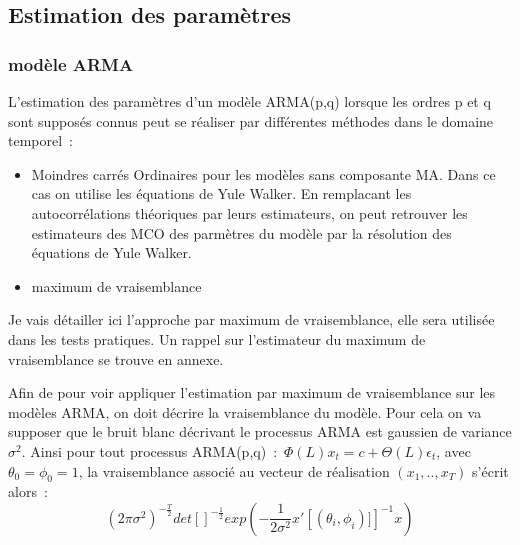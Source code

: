 \documentclass[11pt]{scrartcl} %
\begin{document}
\subsection{Estimation des paramètres}
\subsubsection{modèle ARMA}
L'estimation des paramètres d'un modèle ARMA(p,q) lorsque les ordres p et q sont supposés connus peut se réaliser par différentes méthodes dans le domaine temporel~:
\begin{itemize}
\item Moindres carrés Ordinaires pour les modèles sans composante MA. Dans ce cas on utilise les équations de Yule Walker. En remplacant les autocorrélations théoriques par leurs estimateurs, on peut retrouver les estimateurs des MCO des parmètres du modèle par la résolution des équations de Yule Walker.\\
\item maximum de vraisemblance
\end{itemize}
Je vais détailler ici l'approche par maximum de vraisemblance, elle sera utilisée dans les tests pratiques. Un rappel sur l'estimateur du maximum de vraisemblance se trouve en annexe.

Afin de pour voir appliquer l'estimation par maximum de vraisemblance sur les modèles ARMA, on doit décrire la vraisemblance du modèle. Pour cela on va supposer que le bruit blanc décrivant le processus ARMA est gaussien de variance $\sigma^2$. Ainsi pour tout processus ARMA(p,q)~:~$\Phi(L)x_t = c+ \Theta(L)\epsilon_t$, avec $\theta_0=\phi_0=1$,  la vraisemblance associé au vecteur de réalisation $(x_1,..,x_T)$ s'écrit alors~:
\begin{equation}\label{MLEARMA}
(2\pi\sigma^2)^{-\frac{T}{2}}det\left[\right]^{-\frac{1}{2}}exp\left(-\frac{1}{2\sigma^2}x'\left[(\theta_i,\phi_i)]\right]^{-1}x\right)
\end{equation}
\end{document}
